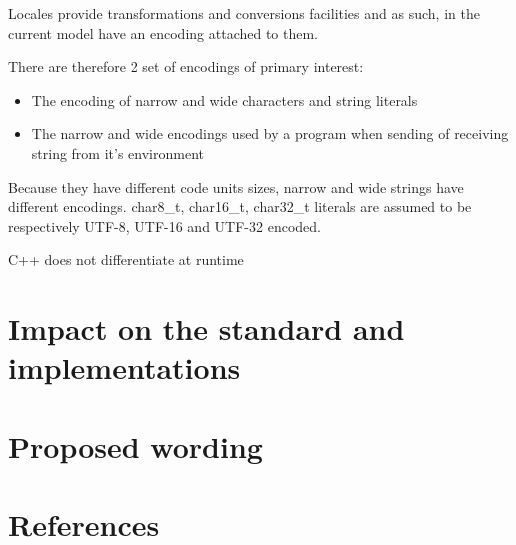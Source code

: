 \documentclass{wg21}
\begin{document}
Locales provide transformations and conversions facilities and as such, in the current model have an encoding attached to them.

There are therefore 2 set of encodings of primary interest:

\begin{itemize}
	\item The encoding of narrow and wide characters and string literals
	\item The narrow and wide encodings used by a program when sending of receiving string from it's environment
\end{itemize}

\note Because they have different code units sizes, narrow and wide strings have different encodings.
char8_t, char16_t, char32_t literals are assumed to be respectively UTF-8, UTF-16 and UTF-32 encoded.
\endnote

C++ does not differentiate at runtime



\section{Impact on the standard and implementations}

\section{Proposed wording}

 
\section{References}
%
%
%
%
\end{document}
